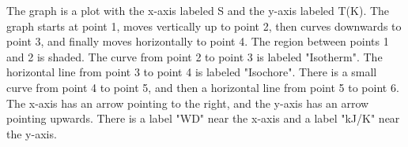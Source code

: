 The graph is a plot with the x-axis labeled S and the y-axis labeled T(K). The graph starts at point 1, moves vertically up to point 2, then curves downwards to point 3, and finally moves horizontally to point 4. The region between points 1 and 2 is shaded. The curve from point 2 to point 3 is labeled "Isotherm". The horizontal line from point 3 to point 4 is labeled "Isochore". There is a small curve from point 4 to point 5, and then a horizontal line from point 5 to point 6. The x-axis has an arrow pointing to the right, and the y-axis has an arrow pointing upwards. There is a label "WD" near the x-axis and a label "kJ/K" near the y-axis.
